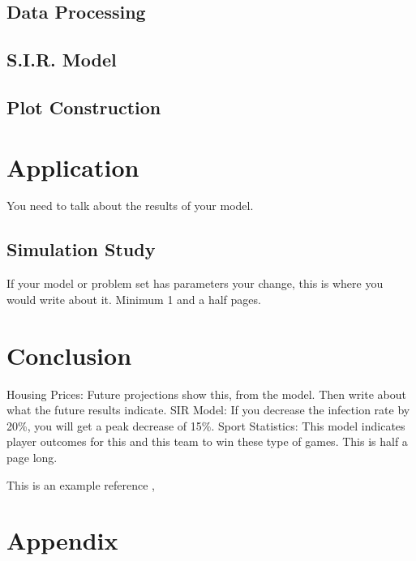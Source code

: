 \documentclass[12pt, centerh1]{article}
\begin{document}
\subsection{Data Processing}
\subsection{S.I.R. Model}
\subsection{Plot Construction}
\newpage
\section{Application}
You need to talk about the results of your model. 
\subsection{Simulation Study}
If your model or problem set has parameters your change, this is where you would write about it. 
Minimum 1 and a half pages. 

\section{Conclusion}
Housing Prices: Future projections show this, from the model. Then write about what the future results indicate. 
SIR Model: If you decrease the infection rate by 20\%, you will get a peak decrease of 15\%. 
Sport Statistics: This model indicates player outcomes for this and this team to win these type of games. 
This is half a page long. 

This is an example reference \cite{pocuca2020}, 




\section*{Appendix}
\end{document}
